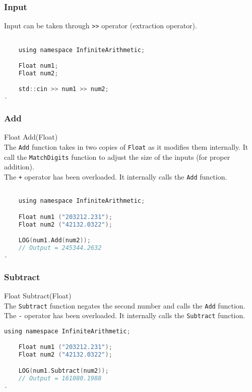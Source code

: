 \subsubsection{Input}
Input can be taken through \verb|>>| operator (extraction operator). 
\vspace*{1em}
\begin{lstlisting}[language = C]	

	using namespace InfiniteArithmetic;

	Float num1;
	Float num2;

	std::cin >> num1 >> num2;
.
\end{lstlisting}
\vspace*{1em}

\subsubsection{Add}
{\ttfamily \large Float Add(Float)} \\[2mm]
The \verb|Add| function takes in two copies of \verb|Float| as it modifies them internally. It call the \verb|MatchDigits| function to adjust the size of the inputs (for proper addition). \\
The \verb|+| operator has been overloaded. It internally calls the \verb|Add| function.
\vspace*{1em}
\begin{lstlisting}[language = C]	

	using namespace InfiniteArithmetic;

	Float num1 ("203212.231");
	Float num2 ("42132.0322");

	LOG(num1.Add(num2));
	// Output = 245344.2632
.
\end{lstlisting}
\vspace*{1em}

\subsubsection{Subtract}
{\ttfamily \large Float Subtract(Float)} \\[2mm]
The \verb|Subtract| function negates the second number and calls the \verb|Add| function. \\
The \verb|-| operator has been overloaded. It internally calls the \verb|Subtract| function.
\vspace*{1em}
\begin{lstlisting}[language = C]	
	using namespace InfiniteArithmetic;

	Float num1 ("203212.231");
	Float num2 ("42132.0322");

	LOG(num1.Subtract(num2));
	// Output = 161080.1988
.
\end{lstlisting}
\vspace*{1em}


